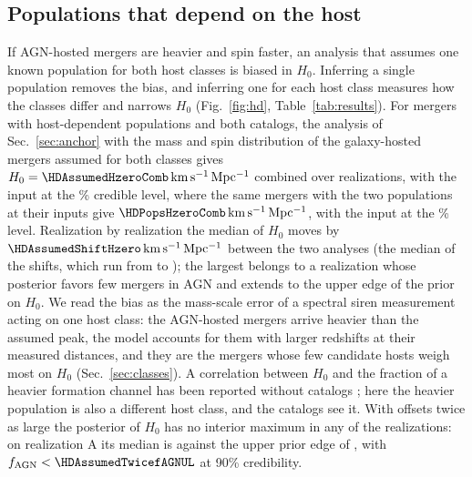 \documentclass[aps,prd,reprint,twocolumn,superscriptaddress,nofootinbib,floatfix,nolongbibliography]{revtex4-2}
\newcommand{\kms}{{\rm km\,s^{-1}\,Mpc^{-1}}}
\newcommand{\fagn}{f_{\rm AGN}}
\begin{document}
\subsection{Populations that depend on the host}
\label{sec:hd}

If AGN-hosted mergers are heavier and spin faster, an analysis that assumes
one known population for both host classes is biased in $H_0$. Inferring a
single population removes the bias, and inferring one for each host class
measures how the classes differ and narrows $H_0$ (Fig.~\ref{fig:hd},
Table~\ref{tab:results}).
For mergers with host-dependent populations and both catalogs, the analysis
of Sec.~\ref{sec:anchor} with the mass and spin distribution of the
galaxy-hosted mergers assumed for both classes gives
$H_0=\HDAssumedHzeroComb\,\kms$ combined over \NrealHDAssumed{} realizations,
with the input \MockHzero{} at the \HDAssumedHzeroCL\% credible level, where
the same mergers with the two populations at their inputs give
$\HDPopsHzeroComb\,\kms$, with the input at the \HDPopsHzeroCL\% level.
Realization by realization the median of $H_0$ moves by
$\HDAssumedShiftHzero\,\kms$ between the two analyses (the median of the
\NrealHDAssumed{} shifts, which run from \HDAssumedShiftHzeroMin{} to
\HDAssumedShiftHzeroMax); the largest belongs to a realization whose
posterior favors few mergers in AGN and extends to the upper edge of the
prior on $H_0$.
We read the bias as the mass-scale error of a
spectral siren measurement \cite{Mastrogiovanni:2021wsd,Pierra:2023deu}
acting on one host class: the AGN-hosted mergers arrive heavier than the
assumed peak, the model accounts for them with larger redshifts at their
measured distances, and they are the mergers whose few candidate hosts weigh
most on $H_0$ (Sec.~\ref{sec:classes}).
A correlation between $H_0$ and the fraction of a heavier formation channel
has been reported without catalogs \cite{Scarpa:2026piy}; here the heavier
population is also a different host class, and the catalogs see it.
With offsets twice as large the posterior of $H_0$ has no interior maximum
in any of the \NrealHDAssumedTwice{} realizations: on
realization A its median is \HDAssumedTwiceHzeroMed{} against the upper
prior edge of \PriorHzeroHi, with $\fagn<\HDAssumedTwicefAGNUL$ at 90\%
credibility.
\end{document}
